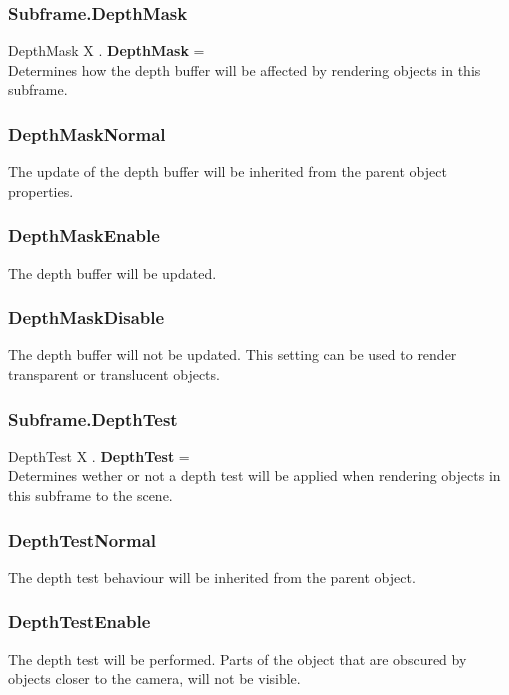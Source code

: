 \documentclass[10pt]{book}
\begin{document}
\subsubsection{Subframe.DepthMask \label{F:Subframe:DepthMask}}
DepthMask X . \textbf{DepthMask} = \\
Determines how the depth buffer will be affected by rendering objects in this subframe.


\subsubsection{DepthMaskNormal \label{T:DepthMask|DepthMaskNormal}}
The update of the depth buffer will be inherited from the parent object properties.

\subsubsection{DepthMaskEnable \label{T:DepthMask|DepthMaskEnable}}
The depth buffer will be updated.

\subsubsection{DepthMaskDisable \label{T:DepthMask|DepthMaskDisable}}
The depth buffer will not be updated. This setting can be used to render transparent or translucent objects.

\subsubsection{Subframe.DepthTest \label{F:Subframe:DepthTest}}
DepthTest X . \textbf{DepthTest} = \\
Determines wether or not a depth test will be applied when rendering objects in this subframe to the scene.

\subsubsection{DepthTestNormal \label{T:DepthTest|DepthTestNormal}}
The depth test behaviour will be inherited from the parent object.

\subsubsection{DepthTestEnable \label{T:DepthTest|DepthTestEnable}}
The depth test will be performed. Parts of the object that are obscured by objects closer to the camera, will not be visible.
\end{document}
